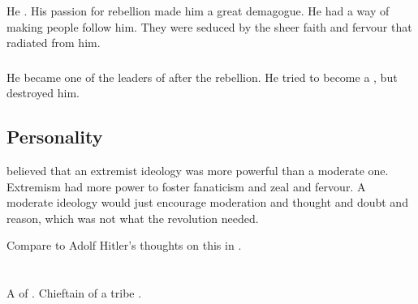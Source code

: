 
%
He .
His passion for rebellion made him a great demagogue. 
He had a way of making people follow him. 
They were seduced by the sheer faith and fervour that radiated from him.





\subsubsection{\Sathariah}
He became one of the leaders of \CiriathSepher{} after the rebellion. 
He tried to become a \sathariah, but \Nexagglachel{} destroyed him. 









\subsection{Personality}
\Kezrabal believed that an extremist ideology was more powerful than a moderate one.
Extremism had more power to foster fanaticism and zeal and fervour. 
A moderate ideology would just encourage moderation and thought and doubt and reason, which was not what the revolution needed.

Compare to Adolf Hitler's thoughts on this in \cite{AdolfHitler:MeinKampf}. 















\section{\Najarod}
\index{\Najarod}
A \resphan{} of \Baelzerach. 
Chieftain of a tribe  \QuessanthIshnaruchaefir. 

